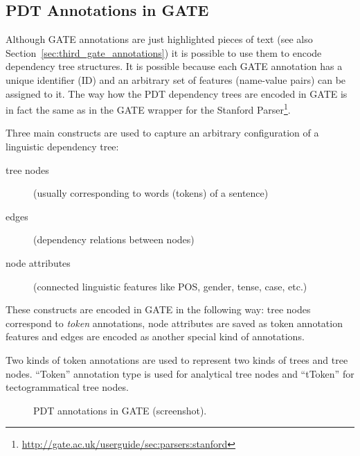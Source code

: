 \subsection{PDT Annotations in GATE} \label{sec:learning_pdt_in_gate} \label{sec:LDR_in_GATE}

Although GATE annotations are just highlighted pieces of text (see also Section~\ref{sec:third_gate_annotations}) it is possible to use them to encode dependency tree structures. It is possible because each GATE annotation has a unique identifier (ID) and an arbitrary set of features (name-value pairs) can be assigned to it. The way how the PDT dependency trees are encoded in GATE is in fact the same as in the GATE wrapper for the Stanford Parser\footnote{\url{http://gate.ac.uk/userguide/sec:parsers:stanford}}. 

Three main constructs are used to capture an arbitrary configuration of a linguistic dependency tree:


\begin{description}
	\item[tree nodes] (usually corresponding to words (tokens) of a sentence)
	\item[edges] (dependency relations between nodes)
	\item[node attributes] (connected linguistic features like POS, gender, tense, case, etc.)
\end{description}

These constructs are encoded in GATE in the following way: tree nodes correspond to \emph{token} annotations, node attributes are saved as token annotation features and edges are encoded as another special kind of annotations.

Two kinds of token annotations are used to represent two kinds of trees and tree nodes. ``Token'' annotation type is used for analytical tree nodes and ``tToken'' for tectogrammatical tree nodes.

\begin{figure}[t!]
	\centering
	\caption{PDT annotations in GATE (screenshot).}
	\label{fig:PDT_GATE}
\end{figure}


